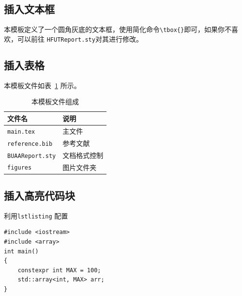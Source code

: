 \documentclass[12pt,hyperref,a4paper,UTF8]{ctexart}
\begin{document}
\subsection{插入文本框}
本模板定义了一个圆角灰底的文本框，使用简化命令\verb|\tbox{}|即可，如果你不喜欢，可以前往 \texttt{HFUTReport.sty}对其进行修改。


\subsection{插入表格}
本模板文件如表~\ref{doc} 所示。
\begin{table}[!htbp]
    \centering
    \begin{tabular}{l  | l}
    \hline
        文件名 & 说明 \\
        \hline
        \texttt{main.tex}  & 主文件 \\
        \texttt{reference.bib} & 参考文献 \\
        \texttt{BUAAReport.sty}  & 文档格式控制\\
        \texttt{figures}  & 图片文件夹 \\
        \hline
    \end{tabular}
    \caption{本模板文件组成}
    \label{doc}
\end{table}

%
%
%
%
%
%
\subsection{插入高亮代码块}
利用\verb|lstlisting| 配置
\begin{lstlisting}[style=CPP, title="c++代码"]
#include <iostream>
#include <array>
int main()
{
    constexpr int MAX = 100;
    std::array<int, MAX> arr;
}  
\end{lstlisting}
\end{document}
